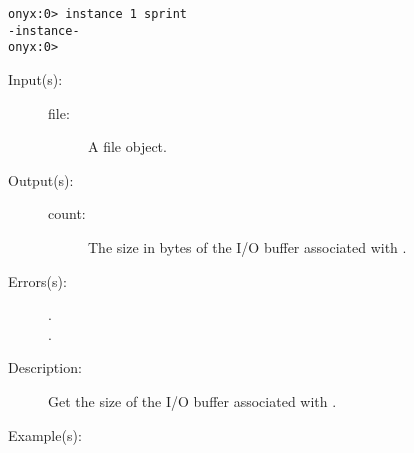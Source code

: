 \begin{description}
\begin{description}
\begin{verbatim}
onyx:0> instance 1 sprint
-instance-
onyx:0>
		\end{verbatim}
	\end{description}
\label{systemdict:iobuf}
\item[{\onyxop{file}{iobuf}{count}}: ]
	\begin{description}\item[]
	\item[Input(s): ]
		\begin{description}\item[]
		\item[file: ]
			A file object.
		\end{description}
	\item[Output(s): ]
		\begin{description}\item[]
		\item[count: ]
			The size in bytes of the I/O buffer associated with
			.
		\end{description}
	\item[Errors(s): ]
		\begin{description}\item[]
		\item[.]
		\item[.]
		\end{description}
	\item[Description: ]
		Get the size of the I/O buffer associated with .
	\item[Example(s): ]\begin{verbatim}


\end{verbatim}
\end{description}
\end{description}
